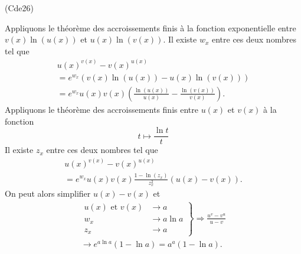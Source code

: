 \begin{tiny}(Cde26)\end{tiny} Appliquons le théorème des accroissements finis à la fonction exponentielle entre $v(x)\ln(u(x))$ et $u(x)\ln(v(x))$.\newline
Il existe $w_x$ entre ces deux nombres tel que
\begin{multline*}
 u(x)^{v(x)} - v(x)^{u(x)} \\
 = e^{w_x}\left( v(x)\ln(u(x)) - u(x)\ln(v(x))\right)\\
 = e^{w_x}u(x)v(x)\left( \frac{\ln(u(x))}{u(x)} - \frac{\ln(v(x))}{v(x)}\right). 
\end{multline*}
Appliquons le théorème des accroissements finis entre $u(x)$ et $v(x)$ à la fonction
\[
 t\mapsto \frac{\ln t}{t}
\]
Il existe $z_x$ entre ces deux nombres tel que
\begin{multline*}
 u(x)^{v(x)} - v(x)^{u(x)} \\
 = e^{w_x}u(x)v(x)\frac{1-\ln(z_x)}{z_x^2}\left(u(x) - v(x)\right). 
\end{multline*}
On peut alors simplifier $u(x) - v(x)$ et 
\begin{multline*}
 \left. 
 \begin{aligned}
  u(x) \text{ et } v(x) &\rightarrow a\\
  w_x &\rightarrow a\ln a \\
  z_x &\rightarrow a
 \end{aligned}
\right\rbrace 
\Rightarrow
\frac{u^{v} - v^{u}}{u - v} \\
\rightarrow e^{a\ln a} (1 - \ln a) = a^a (1 - \ln a).
\end{multline*}
